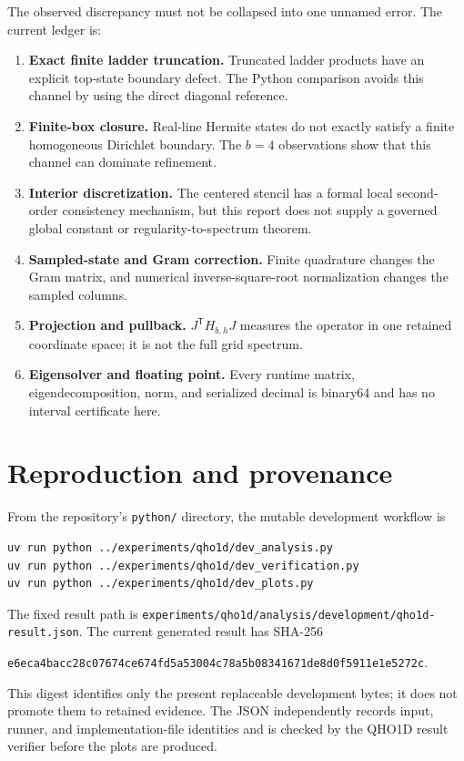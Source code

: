 \documentclass[11pt]{article}
\newcommand{\code}[1]{\texttt{#1}}
\begin{document}
The observed discrepancy must not be collapsed into one unnamed error.  The current
ledger is:
\begin{enumerate}
\item \textbf{Exact finite ladder truncation.} Truncated ladder products have an
explicit top-state boundary defect.  The Python comparison avoids this channel by
using the direct diagonal reference.
\item \textbf{Finite-box closure.} Real-line Hermite states do not exactly satisfy a
finite homogeneous Dirichlet boundary.  The $b=4$ observations show that this channel
can dominate refinement.
\item \textbf{Interior discretization.} The centered stencil has a formal local
second-order consistency mechanism, but this report does not supply a governed global
constant or regularity-to-spectrum theorem.
\item \textbf{Sampled-state and Gram correction.} Finite quadrature changes the Gram
matrix, and numerical inverse-square-root normalization changes the sampled columns.
\item \textbf{Projection and pullback.} $J^{\mathsf T}H_{b,h}J$ measures the operator
in one retained coordinate space; it is not the full grid spectrum.
\item \textbf{Eigensolver and floating point.} Every runtime matrix, eigendecomposition,
norm, and serialized decimal is binary64 and has no interval certificate here.
\end{enumerate}

\section{Reproduction and provenance}

From the repository's \code{python/} directory, the mutable development workflow is
\begin{verbatim}
uv run python ../experiments/qho1d/dev_analysis.py
uv run python ../experiments/qho1d/dev_verification.py
uv run python ../experiments/qho1d/dev_plots.py
\end{verbatim}
The fixed result path is
\code{experiments/qho1d/analysis/development/qho1d-result.json}.  The current generated
result has SHA-256
\begin{center}
\small\code{e6eca4bacc28c07674ce674fd5a53004c78a5b08341671de8d0f5911e1e5272c}.
\end{center}
This digest identifies only the present replaceable development bytes; it does not
promote them to retained evidence.  The JSON independently records input, runner, and
implementation-file identities and is checked by the QHO1D result verifier before the
plots are produced.
\end{document}
